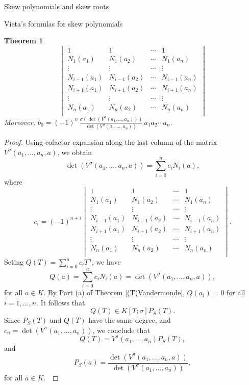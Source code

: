 \documentclass[11pt,a4paper]{article}
\theoremstyle{theorem}
\newtheorem{theorem}{Theorem}[section]
\numberwithin{equation}{section}
\newcommand{\s}{\sigma}
\begin{document}
\begin{section}{Skew polynomials and skew roots}
\begin{subsection}{Vieta's formulas for skew polynomials }
\begin{theorem}
\begin{equation}
\begin{vmatrix}
				1&1&\cdots&1\\
				N_{1}(a_1)&N_{1}(a_2)&\cdots&N_{1}(a_n)\\
				\vdots&\vdots&\cdots&\vdots\\
				N_{i-1}(a_1)&N_{i-1}(a_2)&\cdots&N_{i-1}(a_n)\\
				N_{i+1}(a_1)&N_{i+1}(a_2)&\cdots&N_{i+1}(a_n)\\
				\vdots&\vdots&\cdots&\vdots\\
				N_{n}(a_1)&N_{n}(a_2)&\cdots&N_{n}(a_n)\\
			\end{vmatrix}
		\end{equation}
	Moreover, 
	$b_0=(-1)^{n}\, \frac{\s\left( \det \left( V^\s(a_1,...,a_n)\right)\right) }{\det \left( V^\s(a_1,...,a_n)\right)}\, a_1a_2\cdots a_n.$
	

	\end{theorem}
	 \begin{proof}
	 	Using cofactor expansion along the last column of the matrix $V^\s(a_1,...,a_n,a)$, we obtain
	 	$$\det \left( V^\s(a_1,...,a_n,a)\right)=\sum_{i=0}^n c_i N_i(a),$$
	 	where $$c_i=(-1)^{n+i}\begin{vmatrix}
	 		1&1&\cdots&1\\
	 		N_{1}(a_1)&N_{1}(a_2)&\cdots&N_{1}(a_n)\\
	 		\vdots&\vdots&\cdots&\vdots\\
	 		N_{i-1}(a_1)&N_{i-1}(a_2)&\cdots&N_{i-1}(a_n)\\
	 		N_{i+1}(a_1)&N_{i+1}(a_2)&\cdots&N_{i+1}(a_n)\\
	 		\vdots&\vdots&\cdots&\vdots\\
	 		N_{n}(a_1)&N_{n}(a_2)&\cdots&N_{n}(a_n)\\
	 	\end{vmatrix}.$$  Seting $Q(T)=\sum_{i=0}^nc_i T^n$, we have
	 	$$Q(a)=\sum_{i=0}^nc_i N_i(a)=\det \left( V^\s(a_1,...,a_n,a)\right),$$
	 	for all $a\in K$. By Part (a) of Theorem \ref{(T)Vandermonde}, $Q(a_i)=0$ for all $i=1,...,n$. It follows that   
	 	$$Q(T)\in K[T;\s]P_S(T).$$
	 	Since $P_S(T)$ and $Q(T)$ have the same degree, and $c_n=\det (V^\s(a_1,...,a_n))$, we conclude that
	 	$$Q(T)=V^\s(a_1,...,a_n)P_S(T),$$
	 and
	 $$P_S(a)=\frac{ \det \left( V^\s(a_1,...,a_n,a)\right)  }{\det \left( V^\s(a_1,...,a_n)\right) },$$
	 for all $a\in K$.\
	 

\end{proof}
\end{subsection}
\end{section}
\end{document}
